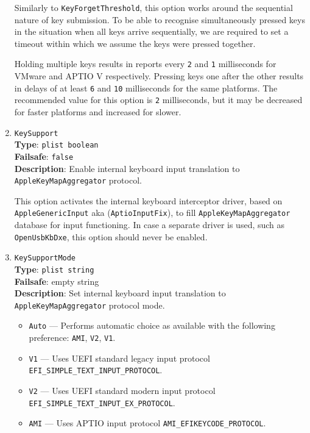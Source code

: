 \documentclass[]{article}
\providecommand{\tightlist}{%
  \setlength{\itemsep}{0pt}\setlength{\parskip}{0pt}}
\begin{document}
\begin{enumerate}
  Similarly to \texttt{KeyForgetThreshold}, this option works around the sequential
  nature of key submission. To be able to recognise simultaneously pressed keys
  in the situation when all keys arrive sequentially, we are required to set
  a timeout within which we assume the keys were pressed together.

  Holding multiple keys results in reports every \texttt{2} and \texttt{1} milliseconds
  for VMware and APTIO V respectively. Pressing keys one after the other results in
  delays of at least \texttt{6} and \texttt{10} milliseconds for the same platforms.
  The recommended value for this option is \texttt{2} milliseconds, but it may be
  decreased for faster platforms and increased for slower.

\item
  \texttt{KeySupport}\\
  \textbf{Type}: \texttt{plist\ boolean}\\
  \textbf{Failsafe}: \texttt{false}\\
  \textbf{Description}: Enable internal keyboard input translation to
  \texttt{AppleKeyMapAggregator} protocol.

  This option activates the internal keyboard interceptor driver, based on
  \texttt{AppleGenericInput} aka (\texttt{AptioInputFix}), to fill
  \texttt{AppleKeyMapAggregator} database for input functioning. In case
  a separate driver is used, such as \texttt{OpenUsbKbDxe}, this option
  should never be enabled.

\item
  \texttt{KeySupportMode}\\
  \textbf{Type}: \texttt{plist\ string}\\
  \textbf{Failsafe}: empty string\\
  \textbf{Description}: Set internal keyboard input translation to
  \texttt{AppleKeyMapAggregator} protocol mode.

  \begin{itemize}
  \tightlist
  \item \texttt{Auto} --- Performs automatic choice as available with the following preference: \texttt{AMI}, \texttt{V2}, \texttt{V1}.
  \item \texttt{V1} --- Uses UEFI standard legacy input protocol \texttt{EFI\_SIMPLE\_TEXT\_INPUT\_PROTOCOL}.
  \item \texttt{V2} --- Uses UEFI standard modern input protocol \texttt{EFI\_SIMPLE\_TEXT\_INPUT\_EX\_PROTOCOL}.
  \item \texttt{AMI} --- Uses APTIO input protocol \texttt{AMI\_EFIKEYCODE\_PROTOCOL}.
  \end{itemize}


\end{enumerate}
\end{document}
